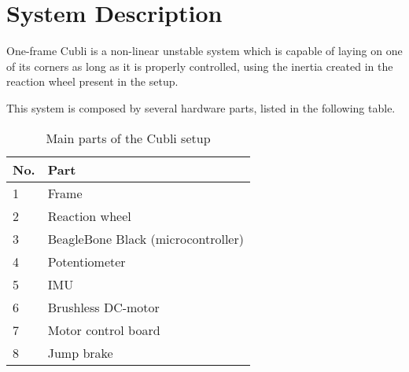 \chapter{System Description}\label{systemDescription}
One-frame Cubli is a non-linear unstable system which is capable of laying on one of its corners as long as it is properly controlled, using the inertia created in the reaction wheel present in the setup.

This system is composed by several hardware parts, listed in the following table. 

\begin{table}[H]
	\begin{tabular}{|l|p{6.7cm}|}
		\hline %
		\textbf{No.} &\textbf{Part} 			\\
		\hline %
		1            & Frame           			\\
		\hline %
		2            & Reaction wheel      		\\
		\hline %
		3            & BeagleBone Black (microcontroller)  \\
		\hline %
		4            & Potentiometer			\\
		\hline %
		5            & IMU          			\\
		\hline %
		6            & Brushless DC-motor   	\\
		\hline %
		7            & Motor control board     	\\
		\hline %
		8            & Jump brake		    	\\
		\hline %
	\end{tabular}
	\caption{Main parts of the Cubli setup}
\label{TableAAUCubliComponent}
\end{table}
